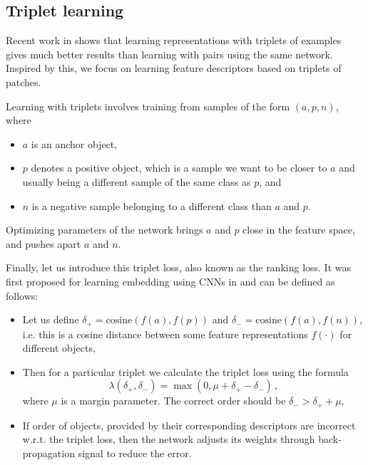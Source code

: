 \subsection{Triplet learning}
Recent work in \cite{hoffer2015deep} shows that learning representations with triplets of examples
gives much better results than learning with pairs using the same network. Inspired by this, we
focus on learning feature descriptors based on triplets of patches.

Learning with triplets involves training from samples of the form $(a, p, n)$, where 
\begin{itemize}
\item  $a$ is an anchor object,
\item $p$ denotes a positive object, which is a sample we want to be closer to $a$ and usually being a different sample of the same class as $p$, and
\item $n$ is a negative sample belonging to a different class than $a$ and $p$.
\end{itemize}
Optimizing parameters of the network brings $a$ and $p$ close in the feature space, and pushes apart $a$ and $n$.

Finally, let us introduce this triplet loss, also known as the ranking loss. It was first proposed for learning embedding using CNNs in \cite{wang2014learning} and can be defined as follows:
\begin{itemize}
\item Let us define $\delta_+ = \mathrm{cosine}(f(a), f(p))$ and $\delta_- = \mathrm{cosine}(f(a), f(n))$, i.e. this is a cosine distance between some feature representations $f(\cdot)$ for different objects,
\item Then for a particular triplet we calculate the triplet loss using the formula
\[
\lambda ( \delta_+, \delta_- ) = \max (0, \mu + \delta_+ - \delta_- ) \,,
\]
where $\mu$ is a margin parameter. The correct order should be $\delta_- > \delta_+ + \mu$,
\item If order of objects, provided by their corresponding descriptors are incorrect w.r.t. the triplet loss, then the network adjusts its weights through back-propagation signal to reduce the error.
\end{itemize}
